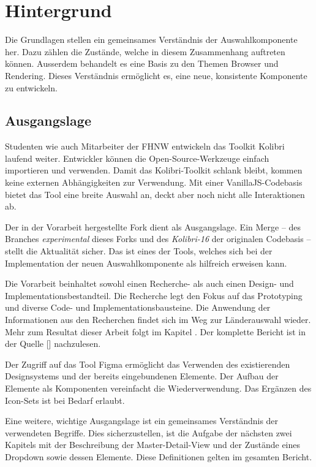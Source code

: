 \chapter{Hintergrund}
\label{chap:background}

Die Grundlagen stellen ein gemeinsames Verständnis der Auswahlkomponente her. 
Dazu zählen die Zustände, welche in diesem Zusammenhang auftreten können. 
Ausserdem behandelt es eine Basis zu den Themen Browser und Rendering. 
Dieses Verständnis ermöglicht es, eine neue, konsistente Komponente zu entwickeln.


\section{Ausgangslage}
\label{sec:basics}

Studenten wie auch Mitarbeiter der FHNW entwickeln das Toolkit Kolibri laufend weiter. 
Entwickler können die Open-Source-Werkzeuge einfach importieren und verwenden.
Damit das Kolibri-Toolkit schlank bleibt, kommen keine externen Abhängigkeiten zur Verwendung. 
Mit einer VanillaJS-Codebasis bietet das Tool eine breite Auswahl an, deckt aber noch nicht alle Interaktionen ab. 

Der in der Vorarbeit\citemarktext{
    [\cite{ip5}]
} hergestellte Fork dient als Ausgangslage.
Ein Merge – des Branches \emph{experimental} dieses Forks und des \emph{Kolibri-16} der originalen Codebasis – stellt die Aktualität sicher. 
Das  ist eines der Tools, welches sich bei der Implementation der neuen Auswahlkomponente als hilfreich erweisen kann. 

Die Vorarbeit beinhaltet sowohl einen Recherche- als auch einen Design- und Implementationsbestandteil. 
Die Recherche legt den Fokus auf das Prototyping und diverse Code- und Implementationsbausteine. 
Die Anwendung der Informationen aus den Recherchen findet sich im Weg zur Länderauswahl wieder. 
Mehr zum Resultat dieser Arbeit folgt im Kapitel \textbf{}. 
Der komplette Bericht ist in der Quelle [\cite{ip5}] nachzulesen. 

Der Zugriff auf das Tool Figma ermöglicht das Verwenden des existierenden Designsystems und der bereits eingebundenen Elemente. 
Der Aufbau der Elemente als Komponenten vereinfacht die Wiederverwendung. 
Das Ergänzen des Icon-Sets ist bei Bedarf erlaubt. 

Eine weitere, wichtige Ausgangslage ist ein gemeinsames Verständnis der verwendeten Begriffe. 
Dies sicherzustellen, ist die Aufgabe der nächsten zwei Kapitels mit der Beschreibung der Master-Detail-View und der Zustände eines Dropdown sowie dessen Elemente. 
Diese Definitionen gelten im gesamten Bericht. 


